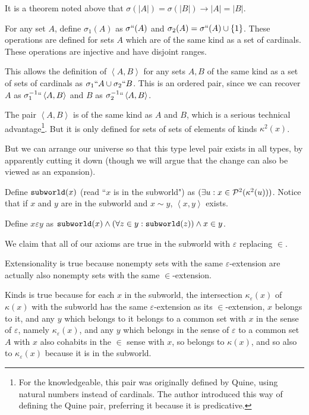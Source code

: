 \documentclass[12pt]{article}
\begin{document}
It is a theorem noted above that $\sigma(|A|) = \sigma(|B|) \rightarrow |A|=|B|$.

For any set $A$, define $\sigma_1(A)$ as $\sigma``(A)$ and $\sigma_2(A)= \sigma``(A) \cup \{1\}$.  These operations are defined for sets $A$ which are of the same kind as a set of cardinals.  These operations are injective and have disjoint ranges.

This allows the definition of $\left<A,B\right>$ for any sets $A,B$ of the same kind as a set of sets of cardinals as
$\sigma_1``A \cup \sigma_2``B$.  This is an ordered pair, since we can recover $A$ as $\sigma_1^{-1}``\left<A,B\right>$ and $B$ as $\sigma_2^{-1}``\left<A,B\right>$.

The pair $\left<A,B\right>$ is of the same kind as $A$ and $B$, which is a serious technical advantage\footnote{For the knowledgeable, this pair was originally defined by Quine, using natural numbers instead of cardinals.  The author introduced this way of defining the Quine pair, preferring it because it is predicative.}.  But it is only defined for sets of sets of elements of kinds $\kappa^2(x)$.

But we can arrange our universe so that this type level pair exists in all types, by apparently cutting it down
(though we will argue that the change can also be viewed as an expansion).

Define ${\tt subworld}(x)$ (read ``$x$ is in the subworld") as $(\exists u:x \in {\cal P}^2(\kappa^2(u)))$.  Notice that if $x$ and $y$ are in the subworld
and $x \sim y$, $\left<x,y\right>$ exists.

Define $x \varepsilon y$ as ${\tt subworld}(x) \wedge {(\forall z \in y:\tt subworld}(z)) \wedge x \in y$.

We claim that all of our axioms are true in the subworld with $\varepsilon$ replacing $\in$.

Extensionality is true because nonempty sets with the same $\varepsilon$-extension are actually also nonempty sets
with the same $\in$-extension.

Kinds is true because for each $x$ in the subworld, the intersection $\kappa_{\varepsilon}(x)$ of $\kappa(x)$ with the subworld  has the same $\varepsilon$-extension as its $\in$-extension,  $x$ belongs to it, and any $y$ which belongs to it
belongs to a common set with $x$ in the sense of $\varepsilon$, namely $\kappa_\varepsilon(x)$, and any $y$ which belongs in the sense of $\varepsilon$ to a common set $A$ with $x$ also cohabits in the $\in$ sense with $x$, so belongs to $\kappa(x)$, and so also to $\kappa_{\varepsilon }(x)$ because it is in the subworld.
\end{document}
